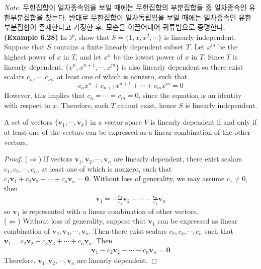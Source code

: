 \textit{Note.} 무한집합이 일차종속임을 보일 때에는 무한집합의 부분집합들 중 일차종속인 유한부분집합을 찾는다. 반대로 무한집합이 일차독립임을 보일 때에는 일차종속인 유한부분집합이 존재한다고 가정한 후, 모순을 이끌어내어 귀류법으로 증명한다. \\

\textbf{(Example 6.28)} In $\mathscr{P}$, show that $S = \{ 1, x, x^2, \cdots \}$ is linearly independent. \\

Suppose that $S$ contains a finite linearly dependent subset $T$. Let $x^m$ be the highest power of $x$ in $T$, and let $x^n$ be the lowest power of $x$ in $T$. Since $T$ is linearly dependent, $\{ x^n, x^{n+1}, \cdots, x^m \}$ is also linearly dependent so there exist scalars $c_n, \cdots, c_m$, at least one of which is nonzero, such that \begin{equation*}
	c_nx^n + c_{n+1}x^{n+1} + \cdots + c_mx^m = 0
\end{equation*} However, this implies that $c_n = \cdots = c_m = 0$, since the equation is an identity with respect to $x$. Therefore, such $T$ cannot exist, hence $S$ is linearly independent. 

\begin{theorem}
	A set of vectors $\{ \textbf{v}_1, \cdots, \textbf{v}_k \}$ in a vector space $V$ is linearly dependent if and only if at least one of the vectors can be expressed as a linear combination of the other vectors.
\end{theorem}

\begin{proof}
	($\Rightarrow$) If vectors $\textbf{v}_1, \textbf{v}_2, \cdots, \textbf{v}_n$ are linearly dependent, there exist scalars $c_1, c_2, \cdots, c_n$, at least one of which is nonzero,  such that $c_1\textbf{v}_1 + c_2\textbf{v}_2 + \cdots + c_n\textbf{v}_n = \textbf{0}$. Without loss of generality, we may assume $c_1 \neq 0$, then
	\begin{align*}
	\textbf{v}_1 = -\frac{c_2}{c_1}\textbf{v}_2 - \cdots - \frac{c_n}{c_1}\textbf{v}_n
	\end{align*}
	so $\textbf{v}_1$ is represented with a linear combination of other vectors. \\
	
	($\Leftarrow$) Without loss of generality, suppose that $\textbf{v}_1$ can be expressed as linear combination of $\textbf{v}_2, \textbf{v}_3, \cdots, \textbf{v}_n$. Then there exist scalars $c_2, c_3, \cdots, c_n$ such that $\textbf{v}_1 = c_2\textbf{v}_2 + c_3\textbf{v}_3 + \cdots + c_n\textbf{v}_n$. Then 
	\begin{align*}
	\textbf{v}_1 - c_2\textbf{v}_2 - \cdots - c_n\textbf{v}_n = \textbf{0}
	\end{align*} Therefore, $\textbf{v}_1, \textbf{v}_2, \cdots, \textbf{v}_n$ are linearly dependent.
\end{proof}

